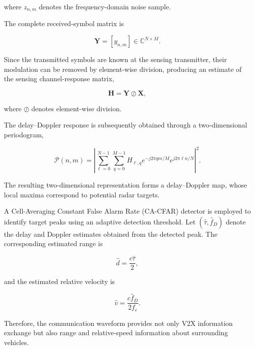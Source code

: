 where $z_{n,m}$ denotes the frequency-domain noise sample.

The complete received-symbol matrix is

\begin{equation}
\mathbf{Y}
=
\left[
y_{n,m}
\right]
\in
\mathbb{C}^{N\times M}.
\label{eq:isac_received_matrix}
\end{equation}

Since the transmitted symbols are known at the sensing transmitter, their
modulation can be removed by element-wise division, producing an estimate of
the sensing channel-response matrix,

\begin{equation}
\mathbf{H}
=
\mathbf{Y}
\oslash
\mathbf{X},
\label{eq:isac_channel_response}
\end{equation}

where $\oslash$ denotes element-wise division.

The delay--Doppler response is subsequently obtained through a
two-dimensional periodogram,

\begin{equation}
\mathcal{P}(n,m)
=
\left|
\sum_{\ell=0}^{N-1}
\sum_{q=0}^{M-1}
H_{\ell,q}
e^{-j2\pi qm/M}
e^{j2\pi \ell n/N}
\right|^2.
\label{eq:isac_periodogram}
\end{equation}

The resulting two-dimensional representation forms a delay--Doppler map,
whose local maxima correspond to potential radar targets.

A Cell-Averaging Constant False Alarm Rate (CA-CFAR) detector is employed
to identify target peaks using an adaptive detection threshold. Let
$(\hat{\tau},\hat{f}_D)$ denote the delay and Doppler estimates obtained
from the detected peak. The corresponding estimated range is

\begin{equation}
\hat{d}
=
\frac{c\hat{\tau}}{2},
\label{eq:isac_range_estimate}
\end{equation}

and the estimated relative velocity is

\begin{equation}
\hat{v}
=
\frac{c\hat{f}_D}{2f_c}.
\label{eq:isac_velocity_estimate}
\end{equation}

Therefore, the communication waveform provides not only V2X information
exchange but also range and relative-speed information about surrounding
vehicles.

